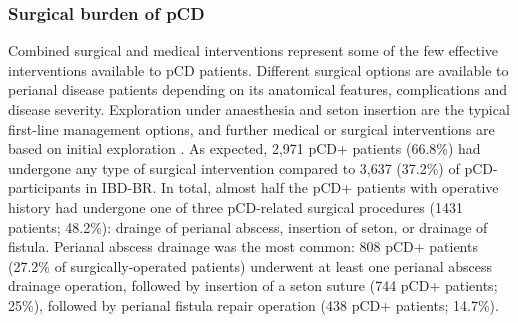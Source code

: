 




    \subsubsection{Surgical burden of pCD}

    Combined surgical and medical interventions represent some of the few effective interventions available to pCD patients. Different surgical options are available to perianal disease patients depending on its anatomical features, complications and disease severity. Exploration under anaesthesia and seton insertion are the typical first-line management options, and further medical or surgical interventions are based on initial exploration \cite{Adegbola2018-ha}. As expected, 2,971 pCD+ patients (66.8\%) had undergone any type of surgical intervention compared to 3,637 (37.2\%) of pCD- participants in IBD-BR. In total, almost half the pCD+ patients with operative history had undergone one of three pCD-related surgical procedures (1431 patients; 48.2\%): drainge of perianal abscess, insertion of seton, or drainage of fistula. Perianal abscess drainage was the most common: 808 pCD+ patients (27.2\% of surgically-operated patients) underwent at least one perianal abscess drainage operation, followed by insertion of a seton suture (744 pCD+ patients; 25\%), followed by perianal fistula repair operation (438 pCD+ patients; 14.7\%).


